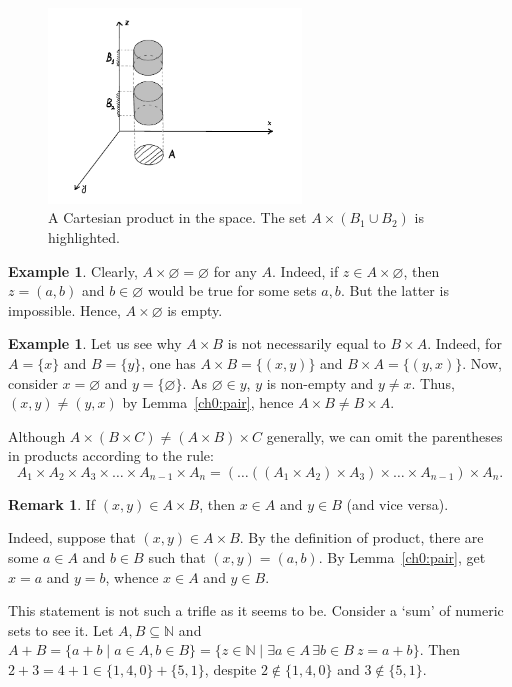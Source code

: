 \documentclass[12pt,notitlepage]{article}
\theoremstyle{plain}
\theoremstyle{definition}
\newtheorem{exm}[thm]{Example}
\newtheorem{rem}[thm]{Remark}
\theoremstyle{plain}
\newcommand{\N}{\mathbb{N}}
\newcommand{\sbs}{\subseteq}
\newcommand{\void}{\varnothing}
\newcommand{\1}{\mathbf{1}}
\newcommand{\0}{\mathbf{0}}
\begin{document}
\begin{figure}[h]
\centering
\includegraphics*[width=0.6\textwidth]{cart_prod.pdf}
\caption{A Cartesian product in the space. The set $A \times (B_1 \cup B_2)$ is highlighted.}
\end{figure}

\begin{exm}
Clearly, $A \times \void = \void$ for any $A$. Indeed, if $z \in A \times \void$, then $z = (a,b)$ and $b \in \void$ would be true for some sets $a, b$. But the latter is impossible. Hence, $A \times \void$ is empty.
\end{exm}

\begin{exm}
Let us see why $A \times B$ is not necessarily equal to $B \times A$. Indeed, for $A = \{ x \}$ and $B = \{ y \}$, one has $A \times B = \{(x,y)\}$ and $B \times A = \{(y,x)\}$. Now, consider $x = \void$ and $y = \{ \void \}$. As $\void \in y$, $y$ is non-empty and $y \neq x$. Thus, $(x,y) \neq (y,x)$ by Lemma~\ref{ch0:pair}, hence $A \times B \neq B \times A$.
\end{exm}

Although $A \times (B \times C) \neq (A \times B) \times C$ generally, we can omit the parentheses in products according to the rule:
$$A_1 \times A_2 \times A_3 \times \ldots \times A_{n-1} \times A_n = (\ldots ((A_1 \times A_2) \times A_3) \times \ldots \times A_{n-1}) \times A_n.$$


\begin{rem}\label{ch0:pair_uniq}
If $(x,y) \in A \times B$, then $x \in A$ and $y \in B$ (and vice versa).

Indeed, suppose that $(x,y) \in A \times B$. By the definition of product, there are some $a \in A$ and $b \in B$ such that $(x,y) = (a,b)$. By Lemma~\ref{ch0:pair}, get $x = a$ and $y = b$, whence $x \in A$ and $y \in B$.

This statement is not such a trifle as it seems to be. Consider a `sum' of numeric sets to see it. Let $A, B \sbs \N$ and $A + B = \{ a + b \mid a \in A, b \in B \} = \{z \in \N \mid \exists a \in A\, \exists b \in B\  z = a + b\}$. Then $2 + 3 = 4 + 1 \in \{1,4,0\} + \{ 5,1 \}$, despite $2 \notin \{1,4,0\}$ and $3 \notin \{5, 1\}$. 
\end{rem}
\end{document}
